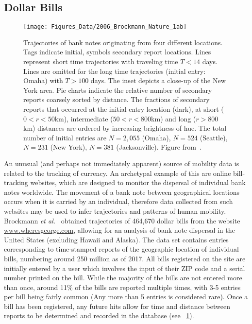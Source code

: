 \subsection{Dollar Bills}
\label{sec:dollar}

\begin{figure}[t!]
\centering
\texttt{[image: Figures\_Data/2006\_Brockmann\_Nature\_1ab]}
\caption{Trajectories of bank notes originating from four different locations. Tags indicate initial, symbols secondary report locations. Lines represent short time trajectories with traveling time $T < 14$ days. Lines are omitted for the long time trajectories (initial
entry: Omaha) with $T > 100$ days. The inset depicts a close-up of the New York area. Pie charts
indicate the relative number of secondary reports coarsely sorted by distance. The fractions of secondary
reports that occurred at the initial entry location (dark), at short ($0 < r < 50$km), intermediate ($50 < r < 800$km) and long ($r > 800$km) distances are ordered by increasing brightness of hue. The
total number of initial entries are $N = 2,055$ (Omaha), $N = 524$ (Seattle), $N = 231$ (New York), $N = 381$ (Jacksonville). Figure from~\cite{brockmann_2006_scaling}.}
\label{fig:2006_Brockmann_Nature_1ab}
\end{figure}

An unusual (and perhaps not immediately apparent) source of mobility data is related to the tracking of currency. An archetypal example of this are online bill-tracking websites, which are designed to monitor the dispersal of individual bank notes worldwide. The movement of a bank note between geographical locations occurs when it is carried by an individual, therefore data collected from such websites may be used to infer  trajectories and patterns of human mobility. Brockmann \emph{et al.}~\cite{brockmann_2006_scaling} obtained trajectories of 464,670 dollar bills from the website \url{www.wheresgeorge.com}, allowing for an analysis of bank note dispersal in the United States (excluding Hawaii and Alaska). The data set contains entries corresponding to time-stamped reports of the geographic location of individual bills, numbering around 250 million as of 2017.  All bills registered on the site are initially entered by a user which involves the input of their ZIP code and a serial number printed on the bill. While the majority of the bills are not entered more than once, around 11\% of the bills are reported multiple times, with 3-5 entries per bill being fairly common (Any more than 5 entries is considered rare). Once a bill has been registered, any future hits allow for time and distance between reports to be determined and recorded in the database (see \figurename~\ref{fig:2006_Brockmann_Nature_1ab}). 

